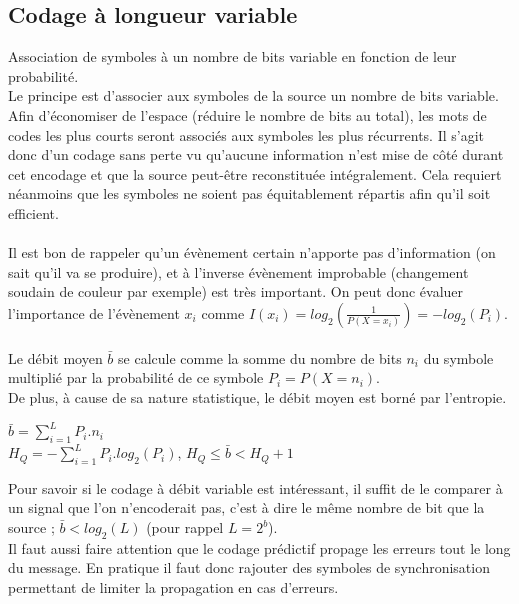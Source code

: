 \documentclass[a4paper,12pt,oneside]{report}	%
\begin{document}
        \subsection{Codage à longueur variable}
            \colorbox{bright-blue}{Association de symboles à un nombre de bits variable en fonction de leur probabilité.}\\
            Le principe est d'associer aux symboles de la source un nombre de bits variable. Afin d'économiser de l'espace (réduire le nombre de bits au total), les mots de codes les plus courts seront associés aux symboles les plus récurrents. Il s'agit donc d'un codage sans perte vu qu'aucune information n'est mise de côté durant cet encodage et que la source peut-être reconstituée intégralement. Cela requiert néanmoins que les symboles ne soient pas équitablement répartis afin qu'il soit efficient.\\\\
            Il est bon de rappeler qu'un évènement certain n'apporte pas d'information (on sait qu'il va se produire), et à l'inverse évènement improbable (changement soudain de couleur par exemple) est très important. On peut donc évaluer l'importance de l'évènement $x_i$ comme $I(x_i)=log_2(\frac{1}{P(X=x_i)})=-log_2(P_i)$.\\\\
            Le débit moyen $\bar{b}$ se calcule comme la somme du nombre de bits $n_i$ du symbole multiplié par la probabilité de ce symbole $P_i=P(X=n_i)$.\\
            De plus, à cause de sa nature statistique, le débit moyen est borné par l'entropie. 
            \begin{center}
                $\bar{b} = \sum_{i=1}^L P_i.n_i$ \\
                $H_Q = -\sum_{i=1}^L P_i.log_2(P_i)$, \quad \quad \quad $H_Q \le \bar{b} < H_Q + 1$
            \end{center}
            Pour savoir si le codage à débit variable est intéressant, il suffit de le comparer à un signal que l'on n'encoderait pas, c'est à dire le même nombre de bit que la source ; $\bar{b} < log_2(L)$ (pour rappel $L=2^b$).\\
            Il faut aussi faire attention que le codage prédictif propage les erreurs tout le long du message. En pratique il faut donc rajouter des symboles de synchronisation permettant de limiter la propagation en cas d'erreurs.
            \newpage
\end{document}
